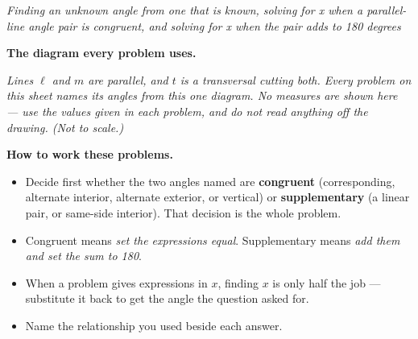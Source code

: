 \documentclass[12pt]{article}
\begin{document}

\begin{center}
\textit{Finding an unknown angle from one that is known, solving for x when a
parallel-line angle pair is congruent, and solving for x when the pair adds to
180 degrees}
\end{center}

\noindent\textbf{The diagram every problem uses.}

\begin{center}
\end{center}

\noindent\small\textit{Lines $\ell$ and $m$ are parallel, and $t$ is a
transversal cutting both. Every problem on this sheet names its angles from
this one diagram. No measures are shown here --- use the values given in each
problem, and do not read anything off the drawing. (Not to scale.)}\normalsize

\vspace{0.3cm}

\noindent\textbf{How to work these problems.}
\begin{itemize}[leftmargin=1.2cm, itemsep=2pt, topsep=2pt]
\item Decide first whether the two angles named are \textbf{congruent}
(corresponding, alternate interior, alternate exterior, or vertical) or
\textbf{supplementary} (a linear pair, or same-side interior). That decision is
the whole problem.
\item Congruent means \emph{set the expressions equal}. Supplementary means
\emph{add them and set the sum to 180}.
\item When a problem gives expressions in $x$, finding $x$ is only half the
job --- substitute it back to get the angle the question asked for.
\item Name the relationship you used beside each answer.
\end{itemize}
\end{document}
